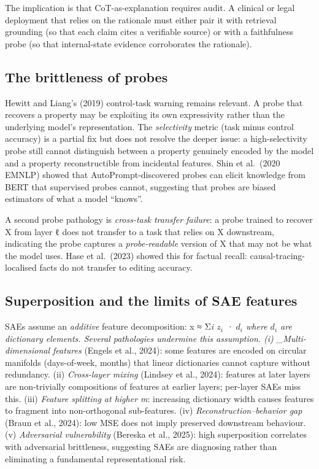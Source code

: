 The implication is that CoT-as-explanation requires audit. A clinical or legal deployment that relies on the rationale must either pair it with retrieval grounding (so that each claim cites a verifiable source) or with a faithfulness probe (so that internal-state evidence corroborates the rationale).

\subsection{The brittleness of probes}\label{the-brittleness-of-probes}

Hewitt and Liang's (2019) control-task warning remains relevant. A probe that recovers a property may be exploiting its own expressivity rather than the underlying model's representation. The \emph{selectivity} metric (task minus control accuracy) is a partial fix but does not resolve the deeper issue: a high-selectivity probe still cannot distinguish between a property genuinely encoded by the model and a property reconstructible from incidental features. Shin et al.~(2020 EMNLP) showed that AutoPrompt-discovered probes can elicit knowledge from BERT that supervised probes cannot, suggesting that probes are biased estimators of what a model ``knows''.

A second probe pathology is \emph{cross-task transfer failure}: a probe trained to recover X from layer ℓ does not transfer to a task that relies on X downstream, indicating the probe captures a \emph{probe-readable} version of X that may not be what the model uses. Hase et al.~(2023) showed this for factual recall: causal-tracing-localised facts do not transfer to editing accuracy.

\subsection{Superposition and the limits of SAE features}\label{superposition-and-the-limits-of-sae-features}

SAEs assume an \emph{additive} feature decomposition: x ≈ Σ\emph{i \(z_i\) · \(d_i\) where \(d_i\) are dictionary elements. Several pathologies undermine this assumption. (i) \_Multi-dimensional features} (Engels et al., 2024): some features are encoded on circular manifolds (days-of-week, months) that linear dictionaries cannot capture without redundancy. (ii) \emph{Cross-layer mixing} (Lindsey et al., 2024): features at later layers are non-trivially compositions of features at earlier layers; per-layer SAEs miss this. (iii) \emph{Feature splitting at higher m}: increasing dictionary width causes features to fragment into non-orthogonal sub-features. (iv) \emph{Reconstruction--behavior gap} (Braun et al., 2024): low MSE does not imply preserved downstream behaviour. (v) \emph{Adversarial vulnerability} (Bereska et al., 2025): high superposition correlates with adversarial brittleness, suggesting SAEs are diagnosing rather than eliminating a fundamental representational risk.

